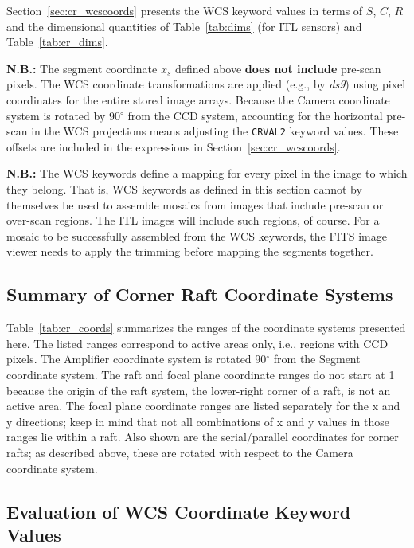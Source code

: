 \documentclass{article}[12pt]
\begin{document}
{Section~\ref{sec:cr_wcscoords} presents the WCS keyword values in terms of $S$, $C$, $R$ and the dimensional quantities of Table~\ref{tab:dims} (for ITL sensors) and Table~\ref{tab:cr_dims}.

{\bf N.B.:} The segment coordinate $x_s$ defined above {\bf does not include} pre-scan pixels.  The WCS coordinate transformations are applied (e.g., by {\it ds9}) using pixel coordinates for the entire stored image arrays.  Because the Camera coordinate system is rotated by 90$^\circ$ from the CCD system, accounting for the horizontal pre-scan in the WCS projections means adjusting the {\tt CRVAL2} keyword values.  These offsets are included in the expressions in Section~\ref{sec:cr_wcscoords}.  

{\bf N.B.:}  The WCS keywords define a mapping for every pixel in the image to which they belong.  That is, WCS keywords as defined in this section cannot by themselves be used to assemble mosaics from images that include pre-scan or over-scan regions.  The ITL images will include such regions, of course.  For a mosaic to be successfully assembled from the WCS keywords, the FITS image viewer needs to apply the trimming before mapping the segments together.

\subsection{Summary of Corner Raft Coordinate Systems\label{sec:cr_wcscoords}}
Table~\ref{tab:cr_coords} summarizes the ranges of the coordinate systems presented here.  The listed ranges correspond to active areas only, i.e., regions with CCD pixels.  The Amplifier coordinate system is rotated 90$^\circ$ from the Segment coordinate system.  The raft and focal plane coordinate ranges do not start at 1 because the origin of the raft system, the lower-right corner of a raft, is not an active area.  The focal plane coordinate ranges are listed separately for the x and y directions; keep in mind that not all combinations of x and y values in those ranges lie within a raft.  Also shown are the serial/parallel coordinates for corner rafts; as described above, these are rotated with respect to the Camera coordinate system.

\subsection{Evaluation of WCS Coordinate Keyword Values\label{sec:wcscoords}}

}
\end{document}
